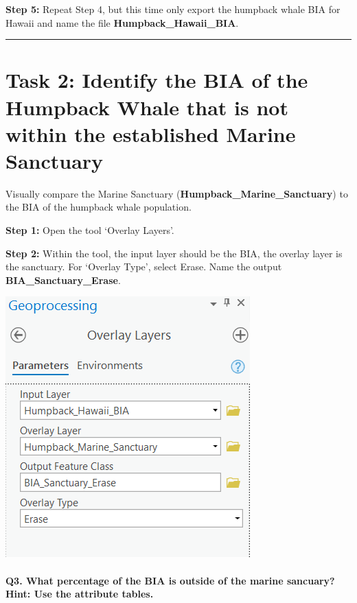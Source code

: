 \documentclass[
]{book}
\begin{document}
\textbf{Step 5:} Repeat Step 4, but this time only export the humpback whale BIA for Hawaii and name the file \textbf{Humpback\_Hawaii\_BIA}.

\begin{center}\rule{0.5\linewidth}{0.5pt}\end{center}

\hypertarget{task-2-identify-the-bia-of-the-humpback-whale-that-is-not-within-the-established-marine-sanctuary}{%
\section*{Task 2: Identify the BIA of the Humpback Whale that is not within the established Marine Sanctuary}\label{task-2-identify-the-bia-of-the-humpback-whale-that-is-not-within-the-established-marine-sanctuary}}

Visually compare the Marine Sanctuary (\textbf{Humpback\_Marine\_Sanctuary}) to the BIA of the humpback whale population.

\textbf{Step 1:} Open the tool `Overlay Layers'.

\textbf{Step 2:} Within the tool, the input layer should be the BIA, the overlay layer is the sanctuary. For `Overlay Type', select Erase. Name the output \textbf{BIA\_Sanctuary\_Erase}.

\includegraphics[width=0.5\linewidth]{images/05-overlay-layers}

\hypertarget{q3.-what-percentage-of-the-bia-is-outside-of-the-marine-sancuary-hint-use-the-attribute-tables.}{%
\paragraph*{Q3. What percentage of the BIA is outside of the marine sancuary? Hint: Use the attribute tables.}\label{q3.-what-percentage-of-the-bia-is-outside-of-the-marine-sancuary-hint-use-the-attribute-tables.}}
\end{document}
